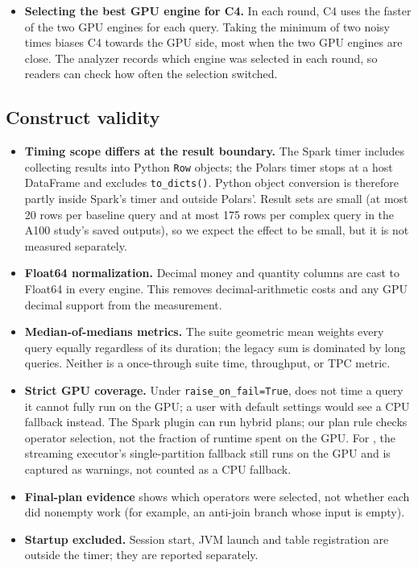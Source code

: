 \documentclass[11pt]{article}
\begin{document}
\begin{itemize}[leftmargin=*,itemsep=2pt]
    listed in the artifact.
\ifladderran
    The same Spark GPU cell varied on the other hosts as well
    ( on the A100;
     on the GH200;
     on the B200).
\fi
  \item \textbf{Selecting the best GPU engine for C4.} In each round, C4
    uses the faster of the two GPU engines for each query. Taking the minimum
    of two noisy times biases C4 towards the GPU side, most when the two GPU
    engines are close. The analyzer records which engine was selected in each
    round, so readers can check how often the selection switched.
\end{itemize}

\subsection{Construct validity}
\begin{itemize}[leftmargin=*,itemsep=2pt]
  \item \textbf{Timing scope differs at the result boundary.} The Spark timer
    includes collecting results into Python \texttt{Row} objects; the Polars
    timer stops at a host DataFrame and excludes \texttt{to\_dicts()}. Python
    object conversion is therefore partly inside Spark's timer and outside
    Polars'. Result sets are small (at most 20 rows per baseline query and at
    most 175 rows per complex query in the A100 study's saved outputs), so we
    expect the effect to be small, but it is not measured separately.
  \item \textbf{Float64 normalization.} Decimal money and quantity columns are
    cast to Float64 in every engine. This removes decimal-arithmetic costs and
    any GPU decimal support from the measurement.
  \item \textbf{Median-of-medians metrics.} The suite geometric mean weights
    every query equally regardless of its duration; the legacy sum is dominated
    by long queries. Neither is a once-through suite time, throughput, or
    TPC metric.
  \item \textbf{Strict GPU coverage.} Under \texttt{raise\_on\_fail=True},
    \polarsgpu{} does not time a query it cannot fully run on the GPU; a user with
    default settings would see a CPU fallback instead. The Spark plugin can run
    hybrid plans; our plan rule checks operator selection, not the fraction of
    runtime spent on the GPU. For \polarsgpu{}, the streaming executor's
    single-partition fallback still runs on the GPU and is captured as
    warnings, not counted as a CPU fallback.
  \item \textbf{Final-plan evidence} shows which operators were selected, not
    whether each did nonempty work (for example, an anti-join branch whose
    input is empty).
  \item \textbf{Startup excluded.} Session start, JVM launch and table
    registration are outside the timer; they are reported separately.
\end{itemize}
\end{document}
